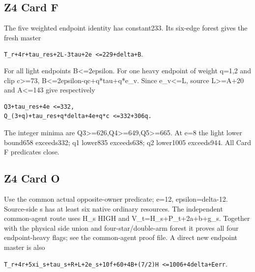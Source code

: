 \documentclass[10pt,a4paper]{article}
\theoremstyle{definition}
\begin{document}
\hypertarget{z4-card-f}{%
\subsection{Z4 Card F}\label{z4-card-f}}

The five weighted endpoint identity has constant233. Its six-edge forest
gives the fresh master

\texttt{T\_\allowbreak{}\allowbreak{}r+\allowbreak{}4r+\allowbreak{}tau\_\allowbreak{}\allowbreak{}res+\allowbreak{}2L-3tau+\allowbreak{}2e <=\allowbreak{}229+\allowbreak{}delta+\allowbreak{}B}.

For all light endpoints B\textless=\allowbreak{}2epsilon. For one heavy endpoint of
weight q=\allowbreak{}1,\allowbreak{}2 and clip c\textgreater=\allowbreak{}73,\allowbreak{}
B\textless=\allowbreak{}2epsilon-qc+\allowbreak{}q*tau+\allowbreak{}q*e\_\allowbreak{}v. Since e\_\allowbreak{}v\textless=\allowbreak{}L,\allowbreak{} source
L\textgreater=\allowbreak{}A+\allowbreak{}20 and A\textless=\allowbreak{}143 give respectively

\begin{lstlisting}
Q3+tau_res+4e <=332,
Q_(3+q)+tau_res+q*delta+4e+q*c <=332+306q.
\end{lstlisting}

The integer minima are
Q3\textgreater=\allowbreak{}626,\allowbreak{}Q4\textgreater=\allowbreak{}649,\allowbreak{}Q5\textgreater=\allowbreak{}665. At e=\allowbreak{}8 the
light lower bound658 exceeds332; q1 lower835 exceeds638; q2 lower1005
exceeds944. All Card F predicates close.

\hypertarget{z4-card-o}{%
\subsection{Z4 Card O}\label{z4-card-o}}

Use the common actual opposite-owner predicate; e=\allowbreak{}12,\allowbreak{} epsilon=\allowbreak{}delta-12.
Source-side s has at least six native ordinary resources. The
independent common-agent route uses H\_\allowbreak{}s HIGH and
V\_\allowbreak{}t=\allowbreak{}H\_\allowbreak{}s+\allowbreak{}P\_\allowbreak{}t+\allowbreak{}2a+\allowbreak{}b+\allowbreak{}g\_\allowbreak{}s. Together with the physical side union and
four-star/double-arm forest it proves all four endpoint-heavy flags; see
the common-agent proof file. A direct new endpoint master is also

\texttt{T\_\allowbreak{}\allowbreak{}r+\allowbreak{}4r+\allowbreak{}5xi\_\allowbreak{}\allowbreak{}s+\allowbreak{}tau\_\allowbreak{}\allowbreak{}s+\allowbreak{}R+\allowbreak{}L+\allowbreak{}2e\_\allowbreak{}\allowbreak{}s+\allowbreak{}10f+\allowbreak{}60+\allowbreak{}4B+\allowbreak{}(7/\allowbreak{}2)H <=\allowbreak{}1006+\allowbreak{}4delta+\allowbreak{}Eerr}.
\end{document}
